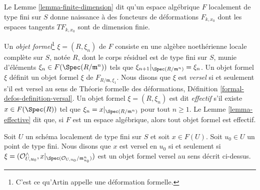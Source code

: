\medskip\noindent
Le Lemme \ref{lemma-finite-dimension} dit qu'un espace algébrique $F$
localement de type fini sur $S$ donne naissance à des foncteurs de déformations
$F_{k, x_0}$ dont les espaces tangents $TF_{k, x_0}$ sont de dimension finie.

\medskip\noindent
Un {\it objet formel}\footnote{C'est ce qu'Artin appelle une déformation formelle.}
$\xi = (R, \xi_n)$ de $F$ consiste en une algèbre noethérienne
locale complète sur $S$, notée $R$, dont le corps résiduel est de type fini
sur $S$, munie d'éléments $\xi_n \in F(\Spec(R/\mathfrak m^n))$
tels que $\xi_{n + 1}|_{\Spec(R/\mathfrak m^n)} = \xi_n$. Un objet
formel $\xi$ définit un objet formel $\xi$ de $F_{R/\mathfrak m, \xi_1}$.
Nous disons que $\xi$ est {\it versel} si et seulement s'il est versel au sens de
Théorie formelle des déformations, Définition \ref{formal-defos-definition-versal}.
Un objet formel $\xi = (R, \xi_n)$ est dit {\it effectif}
s'il existe $x \in F(\Spec(R))$ tel que
$\xi_n = x|_{\Spec(R/\mathfrak m^n)}$ pour tout $n \geq 1$.
Le Lemme \ref{lemma-effective} dit que, si $F$ est un espace algébrique,
alors tout objet formel est effectif.

\medskip\noindent
Soit $U$ un schéma localement de type fini sur $S$ et soit $x \in F(U)$.
Soit $u_0 \in U$ un point de type fini. Nous disons que $x$ est versel en $u_0$
si et seulement si
$\xi = (\mathcal{O}_{U, u_0}^\wedge,
x|_{\Spec(\mathcal{O}_{U, u_0}/\mathfrak m_{u_0}^n)})$
est un objet formel versel au sens décrit ci-dessus.

